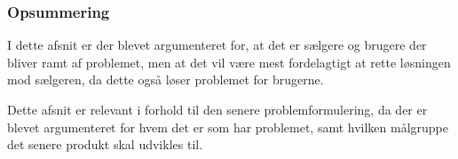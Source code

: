 \subsubsection{Opsummering}
I dette afsnit er der blevet argumenteret for, at det er sælgere og brugere der bliver ramt af problemet, men at det vil være mest fordelagtigt at rette løsningen mod sælgeren, da dette også løser problemet for brugerne.

Dette afsnit er relevant i forhold til den senere problemformulering, da der er blevet argumenteret for hvem det er som har problemet, samt hvilken målgruppe det senere produkt skal udvikles til.
